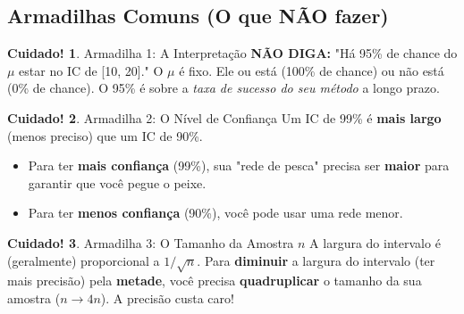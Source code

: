\documentclass[12pt, a4paper]{article}
\theoremstyle{definition} %
\newtheorem{aviso}{Cuidado!}[section]
\theoremstyle{remark} %
\begin{document}
\subsection{Armadilhas Comuns (O que NÃO fazer)}
\begin{aviso}{Armadilha 1: A Interpretação}
    \textbf{NÃO DIGA:} "Há 95\% de chance do $\mu$ estar no IC de [10, 20]."
    O $\mu$ é fixo. Ele ou está (100\% de chance) ou não está (0\% de chance). O 95\% é sobre a \textit{taxa de sucesso do seu método} a longo prazo.
\end{aviso}

\begin{aviso}{Armadilha 2: O Nível de Confiança}
    Um IC de 99\% é \textbf{mais largo} (menos preciso) que um IC de 90\%.
    \begin{itemize}
        \item Para ter \textbf{mais confiança} (99\%), sua "rede de pesca" precisa ser \textbf{maior} para garantir que você pegue o peixe.
        \item Para ter \textbf{menos confiança} (90\%), você pode usar uma rede menor.
    \end{itemize}
\end{aviso}

\begin{aviso}{Armadilha 3: O Tamanho da Amostra $n$}
    A largura do intervalo é (geralmente) proporcional a $1/\sqrt{n}$.
    Para \textbf{diminuir} a largura do intervalo (ter mais precisão) pela \textbf{metade}, você precisa \textbf{quadruplicar} o tamanho da sua amostra ($n \to 4n$). A precisão custa caro!
\end{aviso}
\end{document}
